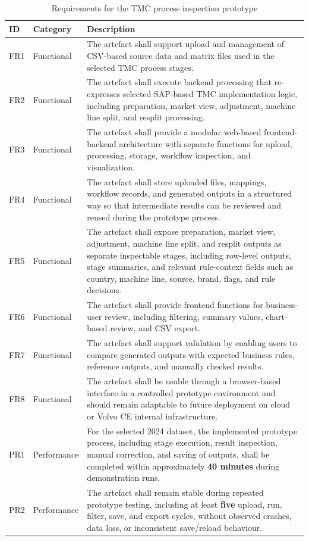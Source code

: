 \renewcommand{\thetable}{4.1}
\begin{table}[htbp]
\centering
\renewcommand{\arraystretch}{1.15}
\setlength{\tabcolsep}{4pt}
\small
\begin{tabularx}{\textwidth}{|>{\raggedright\arraybackslash}p{1.2cm}|>{\raggedright\arraybackslash}p{2.2cm}|>{\raggedright\arraybackslash}X|}
\hline
\textbf{ID} & \textbf{Category} & \textbf{Description} \\
\hline
FR1 & Functional & The artefact shall support upload and management of CSV-based source data and matrix files used in the selected TMC process stages. \\
\hline
FR2 & Functional & The artefact shall execute backend processing that re-expresses selected SAP-based TMC implementation logic, including preparation, market view, adjustment, machine line split, and resplit processing. \\
\hline
FR3 & Functional & The artefact shall provide a modular web-based frontend-backend architecture with separate functions for upload, processing, storage, workflow inspection, and visualization. \\
\hline
FR4 & Functional & The artefact shall store uploaded files, mappings, workflow records, and generated outputs in a structured way so that intermediate results can be reviewed and reused during the prototype process. \\
\hline
FR5 & Functional & The artefact shall expose preparation, market view, adjustment, machine line split, and resplit outputs as separate inspectable stages, including row-level outputs, stage summaries, and relevant rule-context fields such as country, machine line, source, brand, flags, and rule decisions. \\
\hline
FR6 & Functional & The artefact shall provide frontend functions for business-user review, including filtering, summary values, chart-based review, and CSV export. \\
\hline
FR7 & Functional & The artefact shall support validation by enabling users to compare generated outputs with expected business rules, reference outputs, and manually checked results. \\
\hline
FR8 & Functional & The artefact shall be usable through a browser-based interface in a controlled prototype environment and should remain adaptable to future deployment on cloud or Volvo CE internal infrastructure. \\
\hline
PR1 & Performance & For the selected 2024 dataset, the implemented prototype process, including stage execution, result inspection, manual correction, and saving of outputs, shall be completed within approximately \textbf{40 minutes} during demonstration runs. \\
\hline
PR2 & Performance & The artefact shall remain stable during repeated prototype testing, including at least \textbf{five} upload, run, filter, save, and export cycles, without observed crashes, data loss, or inconsistent save/reload behaviour. \\
\hline
\end{tabularx}
\caption{Requirements for the TMC process inspection prototype}
\label{tab:tmc_requirements}
\end{table}
